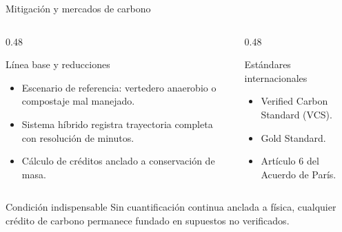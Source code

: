 \documentclass[aspectratio=169, 11pt]{beamer}
\begin{document}
\begin{frame}{Mitigaci\'{o}n y mercados de carbono}
    \begin{columns}[T]
        \begin{column}{0.48\textwidth}
            \begin{block}{L\'{i}nea base y reducciones}
                \begin{itemize}
                    \item Escenario de referencia: vertedero anaerobio o compostaje mal manejado.
                    \item Sistema h\'{i}brido registra trayectoria completa con resoluci\'{o}n de minutos.
                    \item C\'{a}lculo de cr\'{e}ditos anclado a conservaci\'{o}n de masa.
                \end{itemize}
            \end{block}
        \end{column}
        \begin{column}{0.48\textwidth}
            \begin{block}{Est\'{a}ndares internacionales}
                \begin{itemize}
                    \item Verified Carbon Standard (VCS).
                    \item Gold Standard.
                    \item Art\'{i}culo 6 del Acuerdo de Par\'{i}s.
                \end{itemize}
            \end{block}
        \end{column}
    \end{columns}

    \vfill
    \begin{alertblock}{Condici\'{o}n indispensable}
        \centering
        Sin cuantificaci\'{o}n continua anclada a f\'{i}sica, cualquier cr\'{e}dito de carbono permanece fundado en supuestos no verificados.
    \end{alertblock}
\end{frame}
\end{document}
